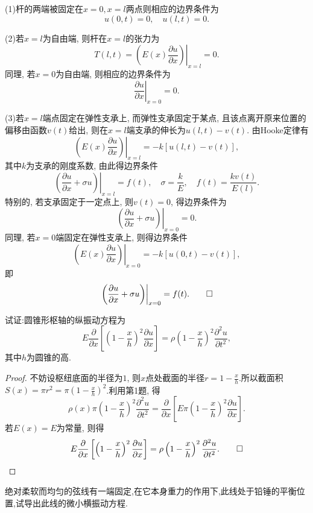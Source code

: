 \begin{solve}
	(1)杆的两端被固定在$x=0, x=l$两点则相应的边界条件为
	$$u(0,t)=0,\quad u(l,t)=0.$$
	
	(2)若$x=l$为自由端, 则杆在$x=l$的张力为
	$$T(l,t)=\left.\left(E(x)\frac{\partial u}{\partial x}\right)\right|_{x=l}=0.$$
	同理, 若$x=0$为自由端, 则相应的边界条件为
	$$\left.\frac{\partial u}{\partial x}\right|_{x=0}=0.$$
	
	(3)若$x=l$端点固定在弹性支承上, 而弹性支承固定于某点, 且该点离开原来位置的偏移由函数$v(t)$给出, 则在$x=l$端支承的伸长为$u(l,t)-v(t)$. 由Hooke定律有
	$$\left.\left(E(x)\frac{\partial u}{\partial x}\right)\right|_{x=l}=-k[u(l,t)-v(t)],$$
	其中$k$为支承的刚度系数, 由此得边界条件
	$$\left.\left(\frac{\partial u}{\partial x}+\sigma u\right)\right|_{x=l}=f(t),\quad\sigma=\frac{k}{E},\quad f(t)=\frac{kv(t)}{E(l)}.$$
	特别的, 若支承固定于一定点上, 则$v(t)=0$, 得边界条件为
	$$\left.\left(\frac{\partial u}{\partial x}+\sigma u\right)\right|_{x=0}=0.$$
	同理, 若$x=0$端固定在弹性支承上, 则得边界条件
	$$\left.\left(E(x)\frac{\partial u}{\partial x}\right)\right|_{x=0}=-k[u(0,t)-v(t)],$$
	即
	\[\left.\left(\frac{\partial u}{\partial x}+\sigma u\right)\right|_{x=0}=f(t).\qedhere\]
\end{solve}


\begin{exercise}
  试证:圆锥形枢轴的纵振动方程为
  \[E\frac{\partial}{\partial x}\left[\left(1-\frac{x}{h}\right)^2\frac{\partial u}{\partial x}\right]=\rho\left(1-\frac{x}{h}\right)^2\frac{\partial^2u}{\partial t^2},\]
  其中$h$为圆锥的高.
\end{exercise}

\begin{proof}
	不妨设枢纽底面的半径为$1$, 则$x$点处截面的半径$\displaystyle r=1-\frac xh$.所以截面积$\displaystyle S(x)=\pi r^2=\pi\left(1-\frac{x}{h}\right)^2$.利用第1题, 得
	$$\rho(x)\pi\left(1-\frac{x}{h}\right)^2\frac{\partial^2u}{\partial t^2}=\frac{\partial}{\partial x}\left[E\pi\left(1-\frac{x}{h}\right)^2\frac{\partial u}{\partial x}\right].$$
	若$E(x)=E$为常量, 则得
	\[E\dfrac{\partial}{\partial x}\left[\left(1-\dfrac{x}{h}\right)^2\dfrac{\partial u}{\partial x}\right]=\rho\left(1-\dfrac{x}{h}\right)^2\dfrac{\partial^2u}{\partial t^2}.\qedhere\]
\end{proof}


\begin{exercise}[6]
  绝对柔软而均匀的弦线有一端固定,在它本身重力的作用下,此线处于铅锤的平衡位置,试导出此线的微小横振动方程.
\end{exercise}

